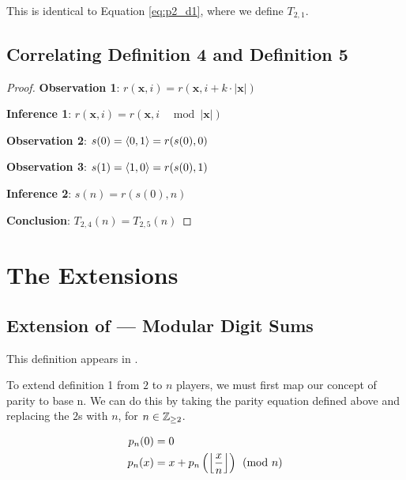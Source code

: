 \documentclass[conference]{IEEEtran}
\begin{document}
This is identical to Equation \ref{eq:p2_d1}, where we define $T_{2,1}$.

\subsection{Correlating Definition 4 and Definition 5}

\begin{proof}
\par\noindent\par
    \textbf{Observation 1}: $r(\textbf{x}, i) = r(\textbf{x}, i + k \cdot |\textbf{x}|)$

    \textbf{Inference 1}: $r(\textbf{x}, i) = r(\textbf{x}, i \;\; \mod{|\textbf{x}|})$

    \textbf{Observation 2}: $s(0) = \langle 0, 1 \rangle = r(s(0), 0)$

    \textbf{Observation 3}: $s(1) = \langle 1, 0 \rangle = r(s(0), 1)$

    \textbf{Inference 2}: $s(n) = r(s(0), n)$


    \textbf{Conclusion}: $T_{2,4}(n) = T_{2,5}(n)$
\end{proof}

\section{The Extensions}

\subsection{Extension  of \TotalExtensions\xspace --- Modular Digit Sums}

This definition appears in \cite{Astudillo_2003, Dekking_2023, OEIS-TMS-3-2, Shallit_2022, Shevelev_2017, OEIS-TMS-negabinary, Starosta_2011, Parshina_2017, Robert_2013}.

To extend definition 1 from $2$ to $n$ players, we must first map our concept of parity to base n. We can do this by taking the parity equation defined above and replacing the $2$s with $n$, for $n \in \mathbb{Z}_{\ge 2}$.

\begin{equation}
    \begin{aligned}
p_n(0) &= 0 \\
p_n(x) &= x + p_n\left(\left\lfloor \dfrac{x}{n} \right\rfloor\right) \pmod{n}
    \end{aligned}
\end{equation}
\end{document}
